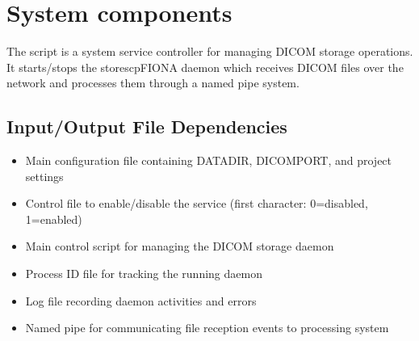 \documentclass[letterpaper,10pt,english]{sphinxmanual}
\begin{document}
\sphinxstepscope


\section{System components}
\label{\detokenize{Architecture/scripts:system-components}}\label{\detokenize{Architecture/scripts::doc}}
\sphinxstepscope

\sphinxAtStartPar
The  script is a system service controller for managing DICOM storage operations. It starts/stops the storescpFIONA daemon which receives DICOM files over the network and processes them through a named pipe system.


\subsection{Input/Output File Dependencies}
\label{\detokenize{Architecture/scripts/storectl:input-output-file-dependencies}}\label{\detokenize{Architecture/scripts/storectl::doc}}



\sphinxAtStartPar
{}
\begin{itemize}
\item {} 
\sphinxAtStartPar
{} \sphinxhyphen{} Main configuration file containing DATADIR, DICOMPORT, and project settings

\item {} 
\sphinxAtStartPar
{} \sphinxhyphen{} Control file to enable/disable the service (first character: 0=disabled, 1=enabled)

\item {} 
\sphinxAtStartPar
{} \sphinxhyphen{} Main control script for managing the DICOM storage daemon

\item {} 
\sphinxAtStartPar
{} \sphinxhyphen{} Process ID file for tracking the running daemon

\item {} 
\sphinxAtStartPar
{} \sphinxhyphen{} Log file recording daemon activities and errors

\item {} 
\sphinxAtStartPar
{} \sphinxhyphen{} Named pipe for communicating file reception events to processing system

\end{itemize}
\end{document}
